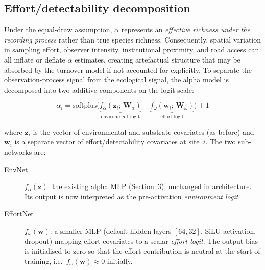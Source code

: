 \documentclass{article}
\begin{document}
\subsection{Effort/detectability decomposition}
\label{sec:effort-decomposition}

Under the equal-draw assumption, $\alpha$ represents an \emph{effective richness under the recording process} rather than true species richness. Consequently, spatial variation in sampling effort, observer intensity, institutional proximity, and road access can all inflate or deflate $\alpha$ estimates, creating artefactual structure that may be absorbed by the turnover model if not accounted for explicitly. To separate the observation-process signal from the ecological signal, the alpha model is decomposed into two additive components on the logit scale:

\begin{equation}
    \alpha_i = \text{softplus}\!\Big(\underbrace{f_\alpha(\mathbf{z}_i;\, \bm{W}_\alpha)}_{\text{environment logit}} + \underbrace{f_\omega(\mathbf{w}_i;\, \bm{W}_\omega)}_{\text{effort logit}}\Big) + 1
\end{equation}

where $\mathbf{z}_i$ is the vector of environmental and substrate covariates (as before) and $\mathbf{w}_i$ is a separate vector of effort/detectability covariates at site~$i$. The two sub-networks are:

\begin{description}
    \item[EnvNet] $f_\alpha(\mathbf{z})$: the existing alpha MLP (Section~3), unchanged in architecture. Its output is now interpreted as the pre-activation \emph{environment logit}.
    \item[EffortNet] $f_\omega(\mathbf{w})$: a smaller MLP (default hidden layers $[64, 32]$, SiLU activation, dropout) mapping effort covariates to a scalar \emph{effort logit}. The output bias is initialised to zero so that the effort contribution is neutral at the start of training, i.e.\ $f_\omega(\mathbf{w}) \approx 0$ initially.
\end{description}
\end{document}
